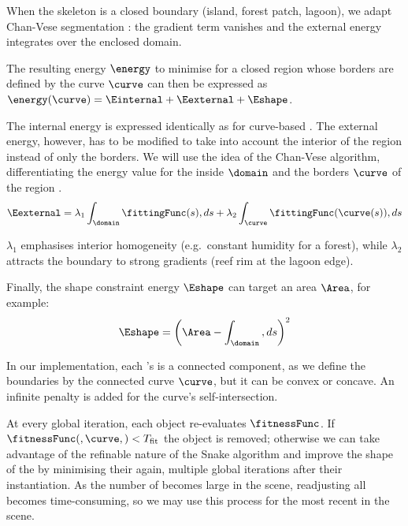 When the skeleton is a closed boundary (island, forest patch, lagoon), we adapt Chan-Vese segmentation \cite{Chan2001}: the gradient term vanishes and the external energy integrates over the enclosed domain.

The resulting energy $\energy$ to minimise for a closed region whose borders are defined by the curve $\curve$ can then be expressed as $\energy(\curve) = \Einternal + \Eexternal + \Eshape$.

The internal energy is expressed identically as for curve-based . The external energy, however, has to be modified to take into account the interior of the region instead of only the borders. We will use the idea of the Chan-Vese algorithm, differentiating the energy value for the inside $\domain$ and the borders $\curve$ of the region \cite{Chan2001, Getreuer2012}.
\begin{align}
    \Eexternal = \lambda_1 \int_{\domain}{ \fittingFunc(s) , ds } + \lambda_2 \int_{\curve}{ \fittingFunc(\curve(s)) , ds }
\end{align}

$\lambda_1$ emphasises interior homogeneity (e.g.\ constant humidity for a forest), while $\lambda_2$ attracts the boundary to strong gradients (reef rim at the lagoon edge).

Finally, the shape constraint energy $\Eshape$ can target an area $\Area$, for example:
\begin{align}
    \Eshape = \left( \Area - \int_{\domain}{ , ds } \right)^2
\end{align}

In our implementation, each 's  is a connected component, as we define the boundaries by the connected curve $\curve$, but it can be convex or concave. An infinite penalty is added for the curve's self-intersection.

At every global iteration, each object re-evaluates $\fitnessFunc$. If $\fitnessFunc(,\curve,)<T_{\mathrm{fit}}$ the object is removed; otherwise we can take advantage of the refinable nature of the Snake algorithm and improve the shape of the  by minimising their  again, multiple global iterations after their instantiation. As the number of  becomes large in the scene, readjusting all  becomes time-consuming, so we may use this process for the most recent  in the scene.


